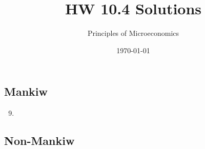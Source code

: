 \documentclass{article}
\title{HW 10.4 Solutions}
\author{Principles of Microeconomics}
\date{\today}
\begin{document}
\maketitle

\subsection*{Mankiw}

\begin{enumerate}
\setcounter{enumi}{8}

\item

\end{enumerate}

\subsection*{Non-Mankiw}
\end{document}
